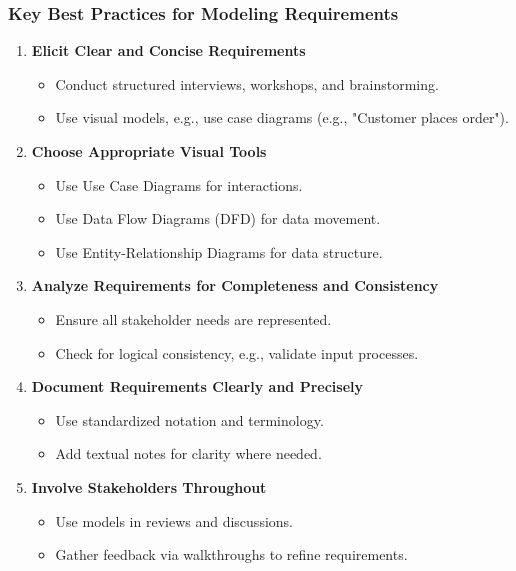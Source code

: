 \documentclass{beamer}
\begin{document}
\begin{frame}[fragile]
    \frametitle{Key Best Practices for Modeling Requirements}
    \begin{enumerate}
        \item \textbf{Elicit Clear and Concise Requirements}
        \begin{itemize}
            \item Conduct structured interviews, workshops, and brainstorming.
            \item Use visual models, e.g., use case diagrams (e.g., "Customer places order").
        \end{itemize}
        \item \textbf{Choose Appropriate Visual Tools}
        \begin{itemize}
            \item Use Use Case Diagrams for interactions.
            \item Use Data Flow Diagrams (DFD) for data movement.
            \item Use Entity-Relationship Diagrams for data structure.
        \end{itemize}
        \item \textbf{Analyze Requirements for Completeness and Consistency}
        \begin{itemize}
            \item Ensure all stakeholder needs are represented.
            \item Check for logical consistency, e.g., validate input processes.
        \end{itemize}
        \item \textbf{Document Requirements Clearly and Precisely}
        \begin{itemize}
            \item Use standardized notation and terminology.
            \item Add textual notes for clarity where needed.
        \end{itemize}
        \item \textbf{Involve Stakeholders Throughout}
        \begin{itemize}
            \item Use models in reviews and discussions.
            \item Gather feedback via walkthroughs to refine requirements.
        \end{itemize}
    \end{enumerate}
\end{frame}
\end{document}
